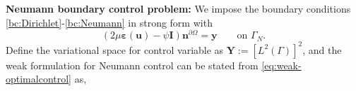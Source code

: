 \documentclass[smallextended]{svjour3}
\numberwithin{equation}{section}
\numberwithin{figure}{section}
\numberwithin{table}{section}
\newcommand\cero{{\boldsymbol{0}}}
\newcommand\bI{\mathbf{I}}
\newcommand\bV{\mathbf{V}}
\newcommand\ff{\boldsymbol{f}}
\newcommand\beps{\boldsymbol{\varepsilon}}
\newcommand\nn{{\boldsymbol{n}}}
\newcommand\bx{\boldsymbol{x}}
\newcommand\by{\boldsymbol{y}}
\newcommand\bu{\boldsymbol{u}}
\newcommand\bv{\boldsymbol{v}}
\newcommand\bz{\boldsymbol{z}}
\newcommand{\bYd}{\boldsymbol{Y}_d}
\newcommand{\bY}{\boldsymbol{Y}}
\begin{document}
\bigskip
\noindent 
{\bf Neumann boundary control problem:}
We impose the boundary conditions \eqref{bc:Dirichlet}-\eqref{bc:Neumann} in strong form with $$(2{\mu} \beps(\bu)  -\psi \bI) \nn^{\partial \Omega} =\by \qquad \text{on } \Gamma_N.$$
    Define the variational space for control variable as $\bY:= [L^2(\Gamma)]^2$, and 
    the weak formulation for Neumann control can be stated from \eqref{eq:weak-optimalcontrol} as,
\end{document}
